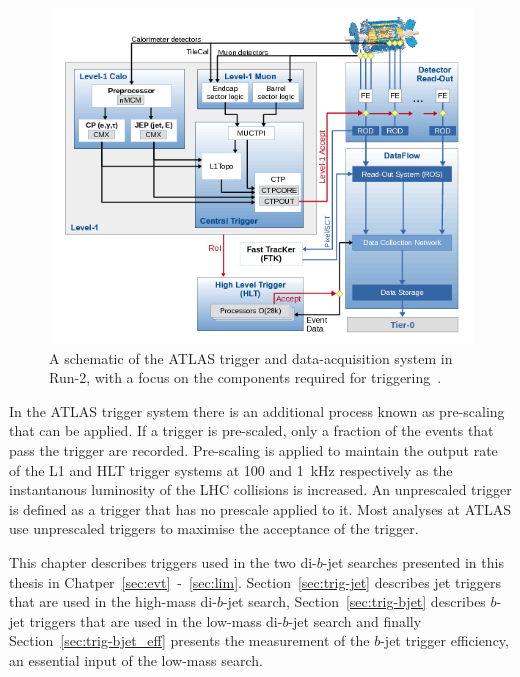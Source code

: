 \begin{figure}[!htb]
  \begin{center}
    \includegraphics[width=1\linewidth, angle=0]{figs/Detector/trigger_schem.png}
  \end{center}
  \caption[A schematic of the ATLAS trigger and data-acquisition system in Run-2, with a focus on the components required for triggering.]
          {A schematic of the ATLAS trigger and data-acquisition system in Run-2, with a focus on the components required for triggering~\cite{det-run2_trigger}.}
  \label{fig:det-trigger_schem}
\end{figure}

In the ATLAS trigger system there is an additional process known as pre-scaling that can be applied.
If a trigger is pre-scaled, only a fraction of the events that pass the trigger are recorded.
Pre-scaling is applied to maintain the output rate of the L1 and HLT trigger systems at 100 and 1~kHz respectively as the instantanous luminosity of the LHC collisions is increased.
An unprescaled trigger is defined as a trigger that has no prescale applied to it.
Most analyses at ATLAS use unprescaled triggers to maximise the acceptance of the trigger.

This chapter describes triggers used in the two di-$b$-jet searches presented in this thesis in Chatper~\ref{sec:evt}~-~\ref{sec:lim}.
Section~\ref{sec:trig-jet} describes jet triggers that are used in the high-mass di-$b$-jet search,
Section~\ref{sec:trig-bjet} describes $b$-jet triggers that are used in the low-mass di-$b$-jet search
and finally Section~\ref{sec:trig-bjet_eff} presents the measurement of the $b$-jet trigger efficiency, an essential input of the low-mass search.

